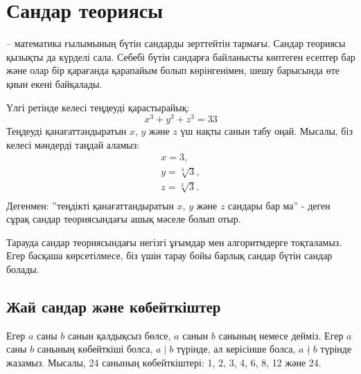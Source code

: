 \chapter{Сандар теориясы}


 -- математика ғылымының бүтін
сандарды зерттейтін тармағы. 
Сандар теориясы қызықты да күрделі сала. Себебі бүтін сандарға байланысты көптеген есептер бар және олар
бір қарағанда қарапайым болып көрінгенімен, шешу барысында 
өте қиын екені байқалады.

Үлгі ретінде келесі теңдеуді қарастырайық:
\[x^3 + y^3 + z^3 = 33\]
Теңдеуді қанағаттандыратын $x$, $y$ және $z$ 
үш нақты санын табу оңай.
Мысалы, біз келесі мәндерді таңдай аламыз:
\[
\begin{array}{lcl}
x = 3, \\
y = \sqrt[3]{3}, \\
z = \sqrt[3]{3}.\\
\end{array}
\]
Дегенмен: ''теңдікті қанағаттандыратын $x$, $y$ және $z$ сандары
бар ма'' \cite{bec07} - деген сұрақ сандар теориясындағы ашық мәселе болып отыр. 

Тарауда сандар теориясындағы негізгі 
ұғымдар мен алгоритмдерге тоқталамыз.
Егер басқаша көрсетілмесе,
біз үшін тарау бойы барлық сандар бүтін сандар болады.


\section{Жай сандар және көбейткіштер}


Егер $a$ саны $b$ санын қалдықсыз бөлсе, 
$a$ санын $b$ санының  немесе 
дейміз.
Егер $a$ саны $b$ санының көбейткіші болса, 
$a \mid b$ түрінде, ал керісінше болса, $a \nmid b$ 
түрінде жазамыз.
Мысалы, 24 санының көбейткіштері: 
1, 2, 3, 4, 6, 8, 12 және 24.

